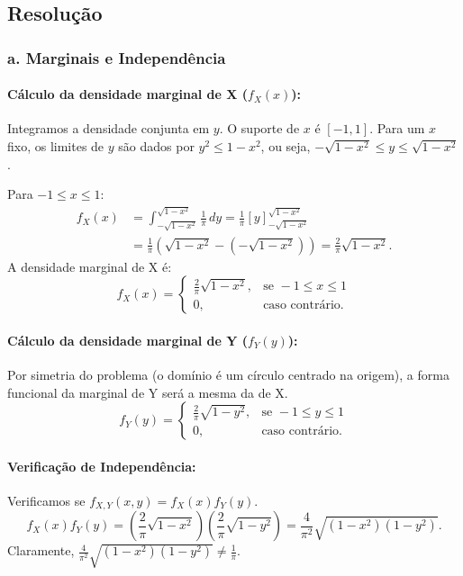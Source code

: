 \documentclass[12pt]{article}
\begin{document}
\subsection*{Resolução}

\subsubsection*{a. Marginais e Independência}

\paragraph{Cálculo da densidade marginal de X ($f_X(x)$):}
Integramos a densidade conjunta em $y$. O suporte de $x$ é $[-1, 1]$. Para um $x$ fixo, os limites de $y$ são dados por $y^2 \le 1-x^2$, ou seja, $-\sqrt{1-x^2} \le y \le \sqrt{1-x^2}$.

Para $-1 \le x \le 1$:
\begin{align*}
f_X(x) &= \int_{-\sqrt{1-x^2}}^{\sqrt{1-x^2}} \frac{1}{\pi} \,dy = \frac{1}{\pi} [y]_{-\sqrt{1-x^2}}^{\sqrt{1-x^2}} \\
&= \frac{1}{\pi} (\sqrt{1-x^2} - (-\sqrt{1-x^2})) = \frac{2}{\pi}\sqrt{1-x^2}.
\end{align*}
A densidade marginal de X é:
\[ f_X(x) = \begin{cases} \frac{2}{\pi}\sqrt{1-x^2}, & \text{se } -1 \le x \le 1 \\ 0, & \text{caso contrário.} \end{cases} \]

\paragraph{Cálculo da densidade marginal de Y ($f_Y(y)$):}
Por simetria do problema (o domínio é um círculo centrado na origem), a forma funcional da marginal de Y será a mesma da de X.
\[ f_Y(y) = \begin{cases} \frac{2}{\pi}\sqrt{1-y^2}, & \text{se } -1 \le y \le 1 \\ 0, & \text{caso contrário.} \end{cases} \]

\paragraph{Verificação de Independência:}
Verificamos se $f_{X,Y}(x,y) = f_X(x)f_Y(y)$.
\[ f_X(x)f_Y(y) = \left(\frac{2}{\pi}\sqrt{1-x^2}\right) \left(\frac{2}{\pi}\sqrt{1-y^2}\right) = \frac{4}{\pi^2}\sqrt{(1-x^2)(1-y^2)}. \]
Claramente, $\frac{4}{\pi^2}\sqrt{(1-x^2)(1-y^2)} \neq \frac{1}{\pi}$.
\end{document}
